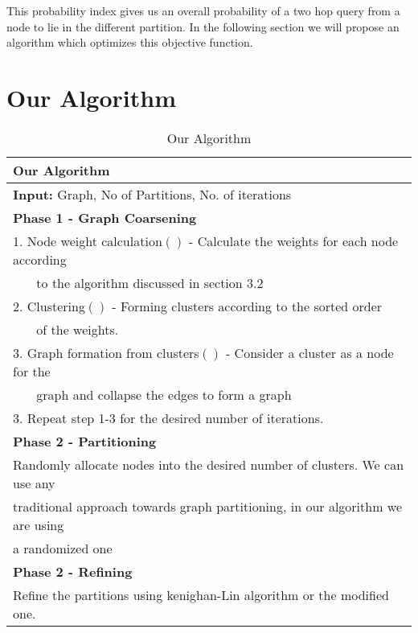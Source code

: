 \documentclass[letterpaper]{article}
\begin{document}
        This probability index gives us an overall probability of a two hop
query from a node to lie in the different partition. In the following section
we will propose an algorithm which optimizes this objective function.

\section{Our Algorithm}
\begin{table*}[htb]
\centering
\begin{tabular}{|l|}%
\hline
\textbf{Our Algorithm}\\
\hline
\textbf{Input: }Graph, No of Partitions, No. of iterations\\
\hline
\textbf{Phase 1 - Graph Coarsening }\\
1. Node weight calculation$()$ - Calculate the weights for each node according \\
~~~ to the algorithm discussed in section 3.2\\
2. Clustering$()$ - Forming clusters according to the sorted order\\
~~~ of the weights.\\
3. Graph formation from clusters$()$ - Consider a cluster as a node for the\\
~~~ graph and collapse the edges to form a graph\\
3. Repeat step 1-3 for the desired number of iterations.\\


\textbf{Phase 2 - Partitioning}\\
 Randomly allocate nodes into the desired number of clusters. We can use any\\
traditional approach towards graph partitioning, in our algorithm  we are using\\
a randomized one\\

\textbf{Phase 2 - Refining}\\
 Refine the partitions using kenighan-Lin algorithm or the modified one.\\
\hline
\end{tabular}
\caption{Our Algorithm}
\label{alg}
\end{table*}
\end{document}
